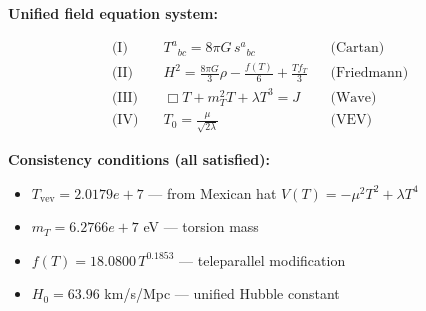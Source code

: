 
\textbf{Unified field equation system:}

\begin{align}
  \text{(I)} \quad & T^a{}_{bc} = 8\pi G \, s^a{}_{bc} && \text{(Cartan)} \\
  \text{(II)} \quad & H^2 = \frac{8\pi G}{3}\rho - \frac{f(T)}{6} + \frac{Tf_T}{3} && \text{(Friedmann)} \\
  \text{(III)} \quad & \Box T + m_T^2 T + \lambda T^3 = J && \text{(Wave)} \\
  \text{(IV)} \quad & T_0 = \frac{\mu}{\sqrt{2\lambda}} && \text{(VEV)}
\end{align}

\textbf{Consistency conditions (all satisfied):}
\begin{itemize}
  \item $T_{\text{vev}} = 2.0179e+7$ — from Mexican hat $V(T) = -\mu^2 T^2 + \lambda T^4$
  \item $m_T = 6.2766e+7$ eV — torsion mass
  \item $f(T) = 18.0800 \, T^{0.1853}$ — teleparallel modification
  \item $H_0 = 63.96$ km/s/Mpc — unified Hubble constant
\end{itemize}